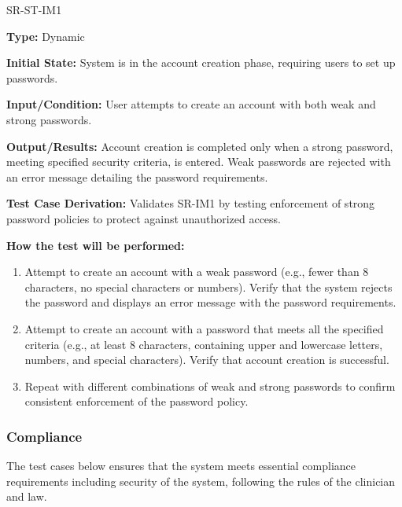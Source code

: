 \documentclass[12pt, titlepage]{article}
\begin{document}
\begin{itemize}
  \begin{item}
    SR-ST-IM1
    \begin{mdframed}[linewidth=0.5mm]
      \textbf{Type:} Dynamic \par
      \textbf{Initial State:} System is in the account creation phase, requiring users to set up passwords. \par
      \textbf{Input/Condition:} User attempts to create an account with both weak and strong passwords. \par
      \textbf{Output/Results:} Account creation is completed only when a strong password, meeting specified 
      security criteria, is entered. Weak passwords are rejected with an error message detailing the password requirements. \par
      \textbf{Test Case Derivation:} Validates SR-IM1 by testing enforcement of strong password policies to protect against unauthorized access. \par
      \textbf{How the test will be performed:}
      \begin{enumerate}[noitemsep]
        \item Attempt to create an account with a weak password (e.g., fewer than 8 characters, no special 
        characters or numbers). Verify that the system rejects the password and displays an error message with the password requirements.
        \item Attempt to create an account with a password that meets all the specified criteria (e.g., at 
        least 8 characters, containing upper and lowercase letters, numbers, and special characters). 
        Verify that account creation is successful.
        \item Repeat with different combinations of weak and strong passwords to confirm consistent 
        enforcement of the password policy.
      \end{enumerate}
    \end{mdframed}
  \end{item}

\end{itemize}

\subsubsection{Compliance}

The test cases below ensures that the system meets essential 
compliance requirements including security of the system, following the rules of the clinician and law.
		
\end{document}
